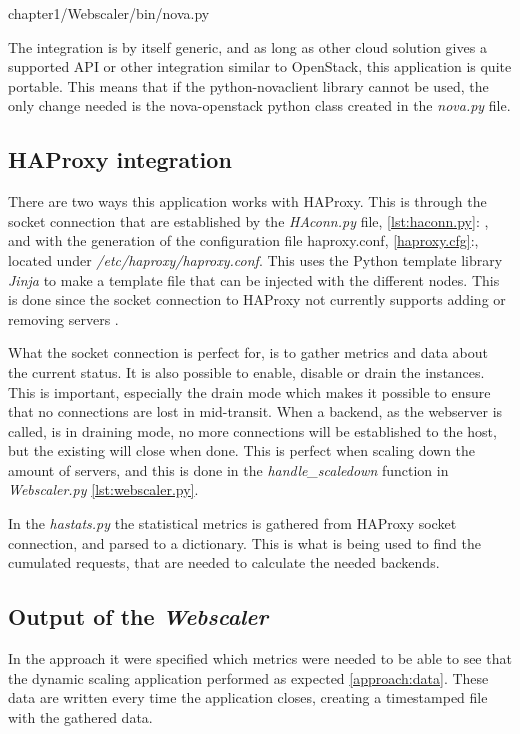 \begin{center}

{chapter1/Webscaler/bin/nova.py}
\end{center}

The integration is by itself generic, and as long as other cloud solution gives
a supported API or other integration similar to OpenStack, this application is
quite portable. This means that if the python-novaclient library cannot be
used, the only change needed is the nova-openstack python class created in the
\textit{nova.py} file.

\subsection{HAProxy integration}
There are two ways this application works with HAProxy. This is through the
socket connection that are established by the \textit{HAconn.py} file,
\ref{lst:haconn.py}: , and with the generation of the
configuration file haproxy.conf, \ref{haproxy.cfg}:,
located under \textit{/etc/haproxy/haproxy.conf}. This uses the Python template
library \textit{Jinja} to make a template file that can be injected with the
different nodes. This is done since the socket connection to HAProxy not
currently supports adding or removing servers
\cite{haproxy:configuration_manual}.

What the socket connection is perfect for, is to gather metrics and data about
the current status. It is also possible to enable, disable or drain the
instances. This is important, especially the drain mode which makes it possible
to ensure that no connections are lost in mid-transit. When a backend, as the
webserver is called, is in draining mode, no more connections will be
established to the host, but the existing will close when done. This is perfect
when scaling down the amount of servers, and this is done in the
\textit{handle\_scaledown} function in \textit{Webscaler.py}
\ref{lst:webscaler.py}.

In the \textit{hastats.py} the statistical metrics is gathered from HAProxy
socket connection, and parsed to a dictionary. This is what is being used to
find the cumulated requests, that are needed to calculate the needed backends.

\subsection{Output of the \textit{Webscaler}}
In the approach it were specified which metrics were needed to be able to see
that the dynamic scaling application performed as expected \ref{approach:data}.
These data are written every time the application closes, creating a
timestamped file with the gathered data.

